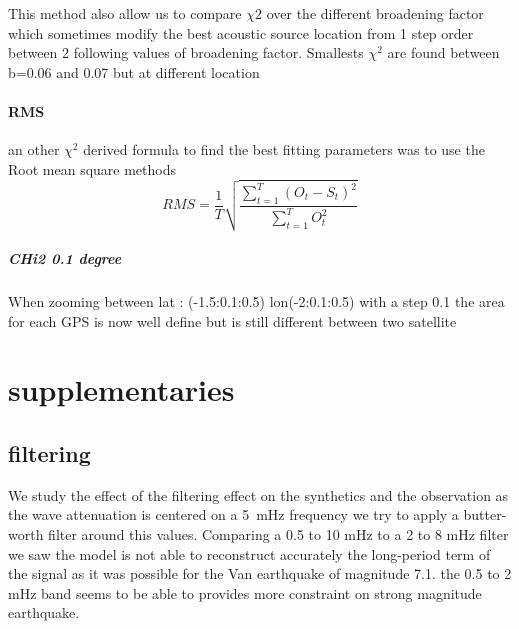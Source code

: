 \documentclass{gji}
\begin{document}

This method also allow us to compare $\chi2$ over the different broadening factor which sometimes modify the best acoustic source location from 1 step order between 2 following values of broadening factor. Smallests $\chi^2$ are found between b=0.06 and 0.07 but at different location
    
\paragraph{RMS}
  an other $\chi^2$ derived formula to find the best fitting parameters was to use the Root mean square methods   
    \begin{equation}
    RMS= \frac{1}{T}\sqrt{\frac{\sum_{t=1}^{T}(O_t-S_t)^2}{\sum_{t=1}^{T} O_t^2 }} 
    \end{equation}
    
   \subparagraph{CHi2 0.1 degree}
   When zooming between lat : (-1.5:0.1:0.5)
lon(-2:0.1:0.5) with a step 0.1 the area for each GPS is now well define but is still different between two satellite
    
 \label{lastpage}   
    
    
 \newpage
 \section{supplementaries}
 \subsection{filtering}
 We study the effect of the filtering effect on the synthetics and the observation
 as the wave attenuation is centered on a 5~mHz frequency we try to apply a butter-worth filter around this values. Comparing a 0.5 to 10 mHz to a 2 to 8 mHz filter we saw the model is not able to reconstruct accurately the long-period term of the signal as it was possible for the Van earthquake of magnitude 7.1. the 0.5 to 2 mHz band seems to be able to provides more constraint on strong magnitude earthquake. 
 
  
 
 \listoftodos
 
 
\end{document}
